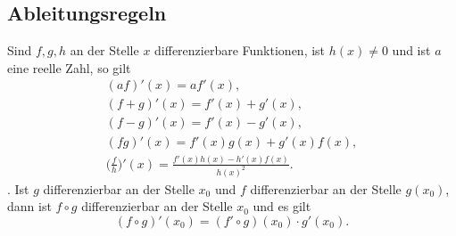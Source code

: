 \subsection{Ableitungsregeln}
Sind $f,g,h$ an der Stelle $x$ differenzierbare Funktionen,
ist $h(x)\ne 0$ und ist $a$ eine reelle Zahl, so gilt
\begin{gather}
(af)'(x) = af'(x),\\
(f+g)'(x) = f'(x)+g'(x),\\
(f-g)'(x) = f'(x)-g'(x),\\
(fg)'(x) = f'(x)g(x)+g'(x)f(x),\\
\Big(\frac{f}{h}\Big)'(x) = \frac{f'(x)h(x)-h'(x)f(x)}{h(x)^2}.
\end{gather}
.
Ist $g$ differenzierbar an der Stelle $x_0$ und
$f$ differenzierbar an der Stelle $g(x_0)$, dann ist $f\circ g$
differenzierbar an der Stelle $x_0$ und es gilt
\begin{equation}
(f\circ g)'(x_0) = (f'\circ g)(x_0)\cdot g'(x_0).
\end{equation}

